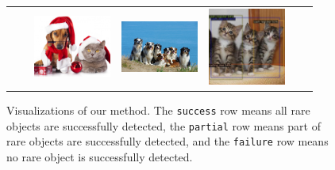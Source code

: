 {\begin{figure}[!ht]
{\begin{tabular}{ccccccc}
			& \rotatebox{90}{\hspace{5mm}\tiny{\texttt{failure}}} &
			\includegraphics[width=1in]{figs/wrong/cat_dog_res.jpg} & \includegraphics[width=1in]{figs/wrong/many_dogs_res.jpg} & \includegraphics[width=1in]{figs/wrong/three_cat_res.jpg}\\
	\end{tabular}}
    \caption{Visualizations of our method. The \texttt{success} row means all rare objects are successfully detected, the \texttt{partial} row means part of rare objects are successfully detected, and the \texttt{failure} row means no rare object is successfully detected. \vspace{1mm}}
    \label{fig:det-vis}
\end{figure}}
